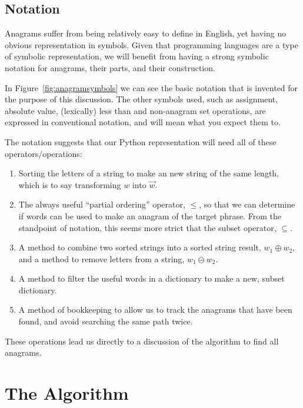 \documentclass[letterpaper, 11pt]{article}
\newcommand{\w}{$w$\xspace}
\newcommand{\aw}{$\overrightarrow{w}$\xspace}
\begin{document}
\begin{samepage}
\section{Notation}

Anagrams suffer from being relatively easy to define
in English, yet having no obvious representation in symbols. Given
that programming languages are a type of symbolic representation,
we will benefit from having a strong symbolic notation for anagrams,
their parts, and their construction.
\end{samepage}

In Figure~\ref{fig:anagramsymbols} we can see the basic notation
that is invented for the purpose of this discussion. The other
symbols used, such as assignment, absolute value, (lexically) less
than and non-anagram set operations, are expressed in conventional
notation, and will mean what you expect them to.

The notation suggests that our Python representation will need all
of these operators/operations:

\begin{enumerate}
\item Sorting the letters of a string to make an new string of the 
same length, which is to say transforming \w into \aw.

\item The always useful ``partial ordering'' operator, $\leq$, so that
we can determine if words can be used to make an anagram of the target
phrase. From the standpoint of notation, this seems more strict that
the subset operator, $\subseteq$.

\item A method to combine two sorted strings into a sorted string
result, $w_1 \oplus w_2$, and a method to remove letters from a string,
$w_1 \ominus w_2$. 

\item A method to filter the useful words in a dictionary to make
a new, subset dictionary.

\item A method of bookkeeping to allow us to track the anagrams that
have been found, and avoid searching the same path twice.
\end{enumerate}

These operations lead us directly to a discussion of the 
algorithm to find all anagrams. 

\newpage
\section{The Algorithm}
\end{document}
